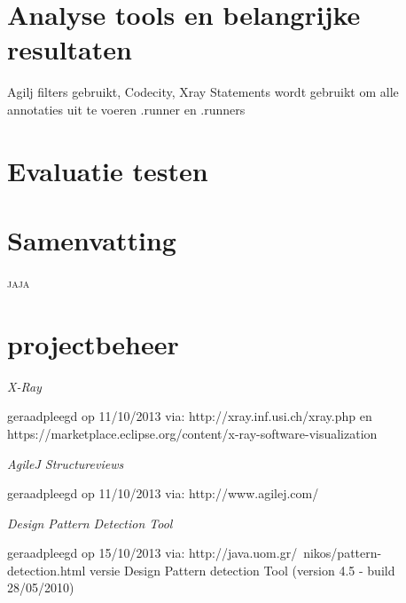 \documentclass[a4paper, 11pt]{article}
\begin{document}
\section{Analyse tools en belangrijke resultaten}
Agilj filters gebruikt, Codecity, Xray
Statements wordt gebruikt om alle annotaties uit te voeren
.runner en .runners

\section{Evaluatie testen}

\section{Samenvatting}

\textsc{jaja}
\section{projectbeheer}


\newpage
\begin{flushleft}
\begin{thebibliography}{4}

\textit{X-Ray}
\begin{scriptsize}
geraadpleegd op 11/10/2013 via: \mbox{http://xray.inf.usi.ch/xray.php} en \mbox{https://marketplace.eclipse.org/content/x-ray-software-visualization}
\end{scriptsize}

\textit{AgileJ Structureviews}
\begin{scriptsize}
geraadpleegd op 11/10/2013 via: \mbox{http://www.agilej.com/}
\end{scriptsize}

\textit{Design Pattern Detection Tool}
\begin{scriptsize}
geraadpleegd op 15/10/2013 via: \mbox{http://java.uom.gr/~nikos/pattern-detection.html} versie  Design Pattern detection Tool (version 4.5 - build 28/05/2010)
\end{scriptsize}

\end{thebibliography}
\end{flushleft}
\end{document}
